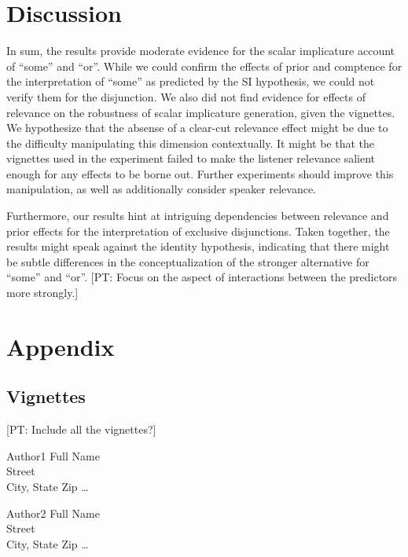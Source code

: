 \documentclass{sp}
\newcommand{\pt}[1]{\textcolor{Cerulean}{[PT: #1]}}
\begin{document}
\section{Discussion}
In sum, the results provide moderate evidence for the scalar implicature account of ``some'' and ``or''. While we could confirm the effects of prior and comptence for the interpretation of ``some'' as predicted by the SI hypothesis, we could not verify them for the disjunction. We also did not find evidence for effects of relevance on the robustness of scalar implicature generation, given the vignettes. We hypothesize that the absense of a clear-cut relevance effect might be due to the difficulty manipulating this dimension contextually. It might be that the vignettes used in the experiment failed to make the listener relevance salient enough for any effects to be borne out. Further experiments should improve this manipulation, as well as additionally consider speaker relevance.

Furthermore, our results hint at intriguing dependencies between relevance and prior effects for the interpretation of exclusive disjunctions. Taken together, the results might speak against the identity hypothesis, indicating that there might be subtle differences in the conceptualization of the stronger alternative for ``some'' and ``or''. \pt{Focus on the aspect of interactions between the predictors more strongly.}

\section{Appendix}
\subsection{Vignettes}
\pt{Include all the vignettes?}



\begin{addresses}
  \begin{address}
    Author1 Full Name \\
    Street \\
    City, State Zip \ldots \\
  \end{address}
  \begin{address}
    Author2 Full Name \\
    Street \\
    City, State Zip \dots \\
  \end{address}
\end{addresses}
\end{document}
